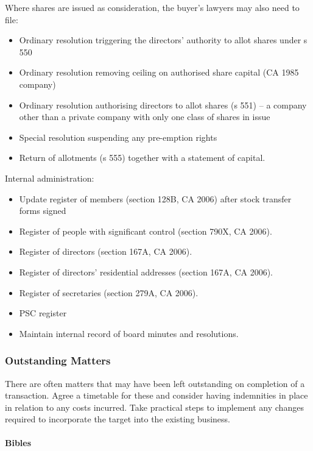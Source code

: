 \documentclass[
]{article}
\providecommand{\tightlist}{%
  \setlength{\itemsep}{0pt}\setlength{\parskip}{0pt}}
\begin{document}
Where shares are issued as consideration, the buyer's lawyers may also
need to file:

\begin{itemize}
\tightlist
\item
  Ordinary resolution triggering the directors' authority to allot
  shares under s 550
\item
  Ordinary resolution removing ceiling on authorised share capital (CA
  1985 company)
\item
  Ordinary resolution authorising directors to allot shares (s 551) -- a
  company other than a private company with only one class of shares in
  issue
\item
  Special resolution suspending any pre-emption rights
\item
  Return of allotments (s 555) together with a statement of capital.
\end{itemize}

Internal administration:

\begin{itemize}
\tightlist
\item
  Update register of members (section 128B, CA 2006) after stock
  transfer forms signed
\item
  Register of people with significant control (section 790X, CA 2006).
\item
  Register of directors (section 167A, CA 2006).
\item
  Register of directors' residential addresses (section 167A, CA 2006).
\item
  Register of secretaries (section 279A, CA 2006).
\item
  PSC register
\item
  Maintain internal record of board minutes and resolutions.
\end{itemize}

\hypertarget{outstanding-matters}{%
\subsubsection{Outstanding Matters}\label{outstanding-matters}}

There are often matters that may have been left outstanding on
completion of a transaction. Agree a timetable for these and consider
having indemnities in place in relation to any costs incurred. Take
practical steps to implement any changes required to incorporate the
target into the existing business.

\hypertarget{bibles}{%
\paragraph{Bibles}\label{bibles}}
\end{document}
